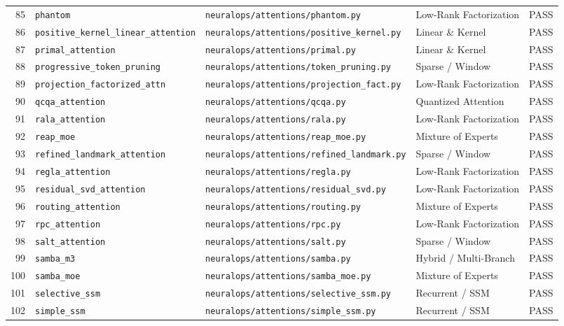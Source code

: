 \begin{center}
\begin{longtable}{rllll}
85 & \texttt{phantom} & \texttt{neuralops/attentions/phantom.py} & Low-Rank Factorization & PASS \\
86 & \texttt{positive\_kernel\_linear\_attention} & \texttt{neuralops/attentions/positive\_kernel.py} & Linear \& Kernel & PASS \\
87 & \texttt{primal\_attention} & \texttt{neuralops/attentions/primal.py} & Linear \& Kernel & PASS \\
88 & \texttt{progressive\_token\_pruning} & \texttt{neuralops/attentions/token\_pruning.py} & Sparse / Window & PASS \\
89 & \texttt{projection\_factorized\_attn} & \texttt{neuralops/attentions/projection\_fact.py} & Low-Rank Factorization & PASS \\
90 & \texttt{qcqa\_attention} & \texttt{neuralops/attentions/qcqa.py} & Quantized Attention & PASS \\
91 & \texttt{rala\_attention} & \texttt{neuralops/attentions/rala.py} & Low-Rank Factorization & PASS \\
92 & \texttt{reap\_moe} & \texttt{neuralops/attentions/reap\_moe.py} & Mixture of Experts & PASS \\
93 & \texttt{refined\_landmark\_attention} & \texttt{neuralops/attentions/refined\_landmark.py} & Sparse / Window & PASS \\
94 & \texttt{regla\_attention} & \texttt{neuralops/attentions/regla.py} & Low-Rank Factorization & PASS \\
95 & \texttt{residual\_svd\_attention} & \texttt{neuralops/attentions/residual\_svd.py} & Low-Rank Factorization & PASS \\
96 & \texttt{routing\_attention} & \texttt{neuralops/attentions/routing.py} & Mixture of Experts & PASS \\
97 & \texttt{rpc\_attention} & \texttt{neuralops/attentions/rpc.py} & Low-Rank Factorization & PASS \\
98 & \texttt{salt\_attention} & \texttt{neuralops/attentions/salt.py} & Sparse / Window & PASS \\
99 & \texttt{samba\_m3} & \texttt{neuralops/attentions/samba.py} & Hybrid / Multi-Branch & PASS \\
100 & \texttt{samba\_moe} & \texttt{neuralops/attentions/samba\_moe.py} & Mixture of Experts & PASS \\
101 & \texttt{selective\_ssm} & \texttt{neuralops/attentions/selective\_ssm.py} & Recurrent / SSM & PASS \\
102 & \texttt{simple\_ssm} & \texttt{neuralops/attentions/simple\_ssm.py} & Recurrent / SSM & PASS \\

\end{longtable}
\end{center}
